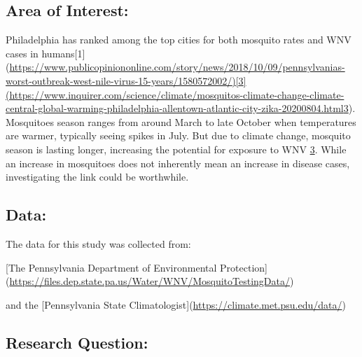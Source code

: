 \documentclass[
  letterpaper,
  DIV=11,
  numbers=noendperiod]{scrartcl}
\begin{document}
\hypertarget{area-of-interest}{%
\subsection{Area of Interest:}\label{area-of-interest}}

Philadelphia has ranked among the top cities for both mosquito rates and
WNV cases in
humans{[}1{]}(\url{https://www.publicopiniononline.com/story/news/2018/10/09/pennsylvanias-worst-outbreak-west-nile-virus-15-years/1580572002/}\href{https://www.publicopiniononline.com/story/news/2018/10/09/pennsylvanias-worst-outbreak-west-nile-virus-15-years/1580572002/}{){[}3{]}(https://www.inquirer.com/science/climate/mosquitos-climate-change-climate-central-global-warming-philadelphia-allentown-atlantic-city-zika-20200804.html}\href{https://www.inquirer.com/science/climate/mosquitos-climate-change-climate-central-global-warming-philadelphia-allentown-atlantic-city-zika-20200804.html}{3}).
Mosquitoes season ranges from around March to late October when
temperatures are warmer, typically seeing spikes in July. But due to
climate change, mosquito season is lasting longer, increasing the
potential for exposure to WNV
\href{\%5Bhttps://www.inquirer.com/science/climate/mosquitos-climate-change-climate-central-global-warming-philadelphia-allentown-atlantic-city-zika-20200804.htmlhttps://www.inquirer.com/science/climate/mosquitos-climate-change-climate-central-global-warming-philadelphia-allentown-atlantic-city-zika-20200804.html\%5D(https://www.inquirer.com/science/climate/mosquitos-climate-change-climate-central-global-warming-philadelphia-allentown-atlantic-city-zika-20200804.html)}{3}.
While an increase in mosquitoes does not inherently mean an increase in
disease cases, investigating the link could be worthwhile.

\hypertarget{data}{%
\subsection{Data:}\label{data}}

The data for this study was collected from:

{[}The Pennsylvania Department of Environmental
Protection{]}(\url{https://files.dep.state.pa.us/Water/WNV/MosquitoTestingData/})

and the {[}Pennsylvania State
Climatologist{]}(\url{https://climate.met.psu.edu/data/})

\hypertarget{research-question}{%
\subsection{Research Question:}\label{research-question}}
\end{document}

